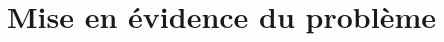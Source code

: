 
\def\xxactivite{Cours}

\def\xxauteur{Xavier Pessoles}
\fichefalse \proftrue \tdfalse \courstrue

\def\xxnumchapitre{Chapitre 7 \vspace{.2cm}}

\def\xxchapitre{Complexité algorithmique }

\def\xxcompetences{%
\textsl{%
\textbf{Savoirs et compétences :}\\
\begin{itemize}[label=\ding{112},font=\color{bleuxp}] 
\item Complexité.
\end{itemize}
}}

\def\xxfigures{
}%


\setlength{\columnseprule}{.1pt}

\vspace{2cm}
\pagestyle{fancy}
\thispagestyle{plain}
\section{Mise en évidence du problème}


